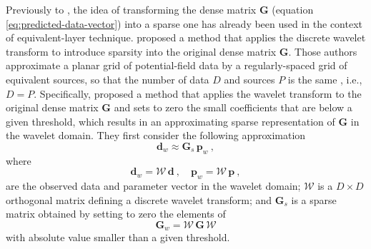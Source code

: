 Previously to \cite{barnes-lumley_2011}, the idea of transforming the dense matrix $\mathbf{G}$ (equation \ref{eq:predicted-data-vector}) 
into a sparse one has already been used in the context of equivalent-layer technique.
\cite{li-oldenburg_2010} proposed a method that applies the discrete wavelet transform to introduce sparsity into 
the original dense matrix $\mathbf{G}$.
Those authors approximate a planar grid of potential-field data by a regularly-spaced grid of equivalent sources,
so that the number of data $D$ and sources $P$ is the same , i.e., $D = P$.
Specifically, \cite{li-oldenburg_2010} proposed a method that applies the wavelet transform to the original dense 
matrix $\mathbf{G}$ and sets to zero the small coefficients that are below a given threshold, which results in an 
approximating sparse representation of $\mathbf{G}$ in the wavelet domain.
They first consider the following approximation
\begin{equation}
	\mathbf{d}_{w} \approx \mathbf{G}_{s} \, \mathbf{p}_{w} \: ,
	\label{eq:approximated-linear-system-wavelet-domain}
\end{equation}
where 
\begin{equation}
	\mathbf{d}_{w} = \boldsymbol{\mathcal{W}} \, \mathbf{d} \: , \quad 
	\mathbf{p}_{w} = \boldsymbol{\mathcal{W}} \, \mathbf{p} \: ,
	\label{eq:vectors-dw-pw}
\end{equation}
are the observed data and parameter vector in the wavelet domain; $\boldsymbol{\mathcal{W}}$ is a $D \times D$ orthogonal matrix defining a 
discrete wavelet transform; and $\mathbf{G}_{s}$ is a sparse matrix obtained by setting to zero the elements of
\begin{equation}
	\mathbf{G}_{w} = \boldsymbol{\mathcal{W}} \, \mathbf{G} \, \boldsymbol{\mathcal{W}}
	\label{eq:matrix-Gw}
\end{equation}
with absolute value smaller than a given threshold.

